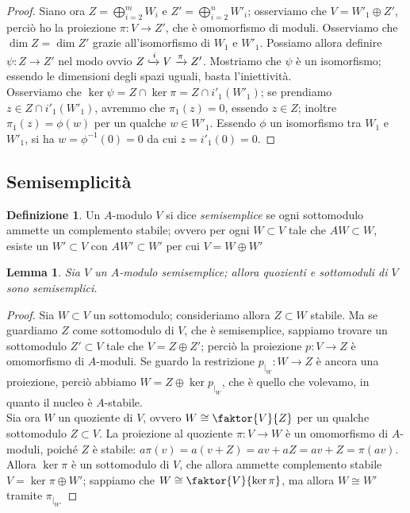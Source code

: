 \documentclass[11pt]{article}
\theoremstyle{plain}
\newtheorem{lemma}[thm]{Lemma}
\theoremstyle{definition}
\newtheorem{defn}{Definizione}[section]
\theoremstyle{remark}
\begin{document}
\begin{proof}
	 Siano ora $Z=\bigoplus_{i=2}^m W_i$ e $Z'=\bigoplus_{i=2}^n W'_i$; osserviamo che $V=W'_1\oplus Z'$, perciò ho la proiezione $\pi:V\to Z'$, che è omomorfismo di moduli. Osserviamo che $\dim Z=\dim Z'$ grazie all'isomorfismo di $W_1$ e $W'_1$.
	 Possiamo allora definire $\psi: Z\to Z'$ nel modo ovvio $Z\xhookrightarrow{i}V\xrightarrow{\pi}Z'$. Mostriamo che $\psi$ è un isomorfismo; essendo le dimensioni degli spazi uguali, basta l'iniettività.\\
	 Osserviamo che $\ker\psi=Z\cap\ker\pi=Z\cap i'_1(W'_1)$; se prendiamo $z\in Z\cap i'_1(W'_1)$, avremmo che $\pi_1(z)=0$, essendo $z\in Z$; inoltre $\pi_1(z)=\phi(w)$ per un qualche $w\in W'_1$. Essendo $\phi$ un isomorfismo tra $W_1$ e $W'_1$, si ha $w=\phi^{-1}(0)=0$ da cui $z=i'_1(0)=0$.
	\end{proof}

\subsection{Semisemplicità}
  \begin{defn}
   Un $A$-modulo $V$ si dice \emph{semisemplice} se ogni sottomodulo ammette un complemento stabile; ovvero per ogni $W\subset V$ tale che $AW\subset W$, esiste un $W'\subset V$ con $AW'\subset W'$ per cui $V=W\oplus W'$
  \end{defn}

  \begin{lemma}\label{quoz_smod_ss}
  	Sia $V$ un $A$-modulo semisemplice; allora quozienti e sottomoduli di $V$ sono semisemplici.
  \end{lemma}
  \begin{proof}
   Sia $W\subset V$ un sottomodulo; consideriamo allora $Z\subset W$ stabile. Ma se guardiamo $Z$ come sottomodulo di $V$, che è semisemplice, sappiamo trovare un sottomodulo $Z'\subset V$ tale che $V=Z\oplus Z'$; perciò la proiezione $p:V\to Z$ è omomorfismo di $A$-moduli. Se guardo la restrizione $p_{|_{W}}:W\to Z$ è ancora una proiezione, perciò abbiamo $W=Z\oplus\ker p_{|_{W}}$, che è quello che volevamo, in quanto il nucleo è $A$-stabile.\\
   Sia ora $W$ un quoziente di $V$, ovvero $W\cong\faktor{V}{Z}$ per un qualche sottomodulo $Z\subset V$. La proiezione al quoziente $\pi: V\to W$ è un omomorfismo di $A$-moduli, poiché $Z$ è stabile: $a\pi(v)=a(v+Z)=av+aZ=av+Z=\pi(av)$.\\
   Allora $\ker\pi$ è un sottomodulo di $V$, che allora ammette complemento stabile $V=\ker\pi\oplus W'$; sappiamo che $W\cong\faktor{V}{\ker\pi}$, ma allora $W\cong W'$ tramite $\pi_{|_{W'}}$
  \end{proof}
\end{document}

